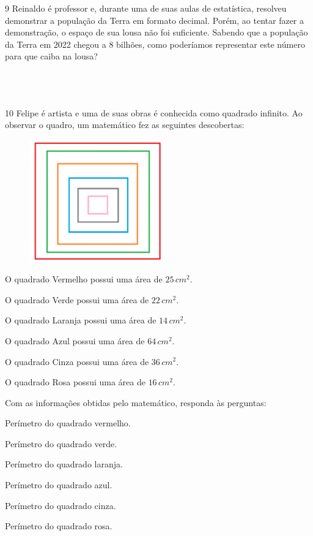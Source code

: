 \num{9} Reinaldo é professor e, durante uma de suas aulas de estatística,
resolveu demonstrar a população da Terra em formato decimal. Porém, ao
tentar fazer a demonstração, o espaço de sua lousa não foi suficiente.
Sabendo que a população da Terra em 2022 chegou a 8 bilhões, como
poderíamos representar este número para que caiba na lousa?

\\
\\
\\

\num{10} Felipe é artista e uma de suas obras é conhecida como quadrado
infinito. Ao observar o quadro, um matemático fez as seguintes
descobertas:

\begin{figure}[H]
\centering\includegraphics[width=2.3125in,height=2.07917in]{./imgSAEB_8_MAT/media/image2.png}
\end{figure}

O quadrado Vermelho possui uma área de $25\,cm^2$.

O quadrado Verde possui uma área de $22\,cm^2$.

O quadrado Laranja possui uma área de $14\,cm^2$.

O quadrado Azul possui uma área de $64\,cm^2$.

O quadrado Cinza possui uma área de $36\,cm^2$.

O quadrado Rosa possui uma área de $16\,cm^2$.

Com as informações obtidas pelo matemático, responda às perguntas:

\begin{escolha}
\item Perímetro do quadrado vermelho.
\item Perímetro do quadrado verde.
\item Perímetro do quadrado laranja.
\item Perímetro do quadrado azul.
\item Perímetro do quadrado cinza.
\item Perímetro do quadrado rosa.
\end{escolha}

